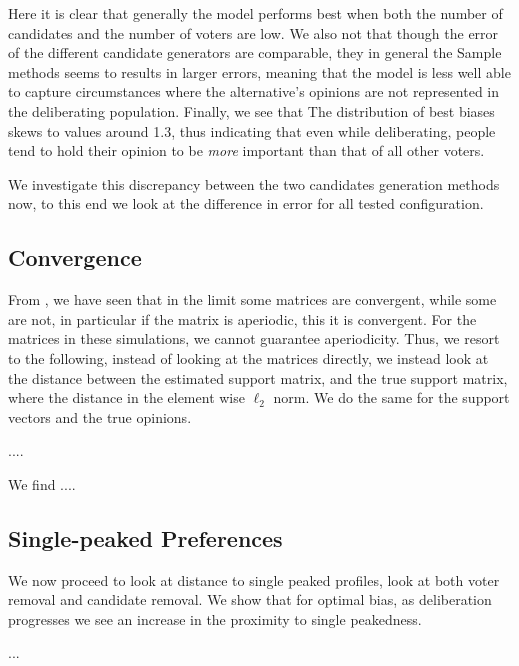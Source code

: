 Here it is clear that generally the model performs best when both the number of
candidates and the number of voters are low. We also not that though the error
of the different candidate generators are comparable, they in general the
Sample methods seems to results in larger errors, meaning that the model is
less well able to capture circumstances where the alternative's opinions are
not represented in the deliberating population. Finally, we see that The
distribution of best biases skews to values around 1.3, thus indicating that
even while deliberating, people tend to hold their opinion to be \textit{more}
important than that of all other voters.

We investigate this discrepancy between the two candidates generation methods
now, to this end we look at the difference in error for all tested
configuration. 


\subsection{Convergence}

From , we have seen that in the limit some matrices are
convergent, while some are not, in particular if the matrix is aperiodic, this
it is convergent. For the matrices in these simulations, we cannot guarantee 
aperiodicity. Thus, we resort to the following, instead of looking at the
matrices directly, we instead look at the distance between the estimated
support matrix, and the true support matrix, where the distance in the element
wise $\ell_2$ norm. We do the same for the support vectors and the true
opinions.

....


We find ....


\subsection{Single-peaked Preferences}

We now proceed to look at distance to single peaked profiles, look at both
voter removal and candidate removal. We show that for optimal bias, as
deliberation progresses we see an increase in the proximity to single
peakedness.

...
